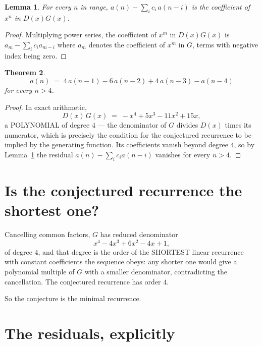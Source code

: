 \documentclass[11pt,a4paper]{article}
\theoremstyle{plain}
\newtheorem{theorem}{Theorem}
\newtheorem{lemma}[theorem]{Lemma}
\theoremstyle{definition}
\begin{document}
\begin{lemma}\label{lem:key}
For every $n$ in range, $a(n)-\sum_i c_i\,a(n-i)$ is the coefficient of $x^{n}$ in
$D(x)G(x)$.
\end{lemma}

\begin{proof}
Multiplying power series, the coefficient of $x^{m}$ in $D(x)G(x)$ is
$a_m-\sum_i c_i a_{m-i}$ where $a_m$ denotes the coefficient of $x^{m}$ in $G$, terms with
negative index being zero.
\end{proof}

\begin{theorem}
\[
a(n)\;=\;4\,a(n-1) - 6\,a(n-2) + 4\,a(n-3) - a(n-4)
\]
for every $n>4$.
\end{theorem}

\begin{proof}
In exact arithmetic,
\[
D(x)\,G(x)\;=\;- x^{4} + 5 x^{3} - 11 x^{2} + 15 x,
\]
a POLYNOMIAL of degree $4$ --- the denominator of $G$ divides $D(x)$ times its numerator,
which is precisely the condition for the conjectured recurrence to be implied by the
generating function. Its coefficients vanish beyond degree $4$, so by
Lemma~\ref{lem:key} the residual $a(n)-\sum_ic_ia(n-i)$ vanishes for every
$n>4$.
\end{proof}

\section{Is the conjectured recurrence the shortest one?}

Cancelling common factors, $G$ has reduced denominator
\[
x^{4} - 4 x^{3} + 6 x^{2} - 4 x + 1,
\]
of degree $4$, and that degree is the order of the SHORTEST linear recurrence with
constant coefficients the sequence obeys: any shorter one would give a polynomial multiple of
$G$ with a smaller denominator, contradicting the cancellation. The conjectured recurrence has
order $4$.

So the conjecture is the minimal recurrence.

\section{The residuals, explicitly}
\end{document}

